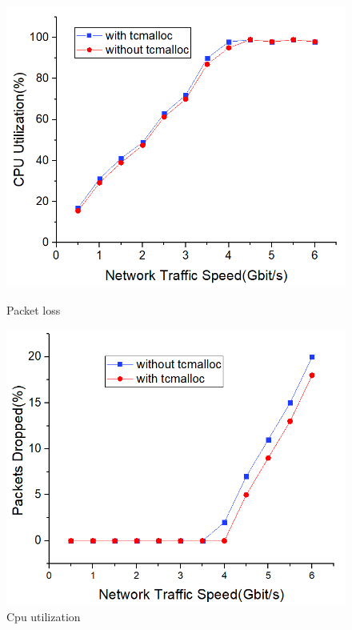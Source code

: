 \documentclass[conference]{IEEEtran}
\begin{document}
\begin{figure}
\begin{minipage}[t]{0.495\linewidth}
\flushleft
\includegraphics[width=\textwidth]{./picture/Figure12.jpg}
\caption{Packet loss} 
\label{fig:13}
\end{minipage}
\begin{minipage}[t]{0.495\linewidth}
\flushright
\includegraphics[width=\textwidth]{./picture/Figure13.jpg}
\caption{Cpu utilization}
\label{fig:14}
\end{minipage}
\end{figure} 
\end{document}
